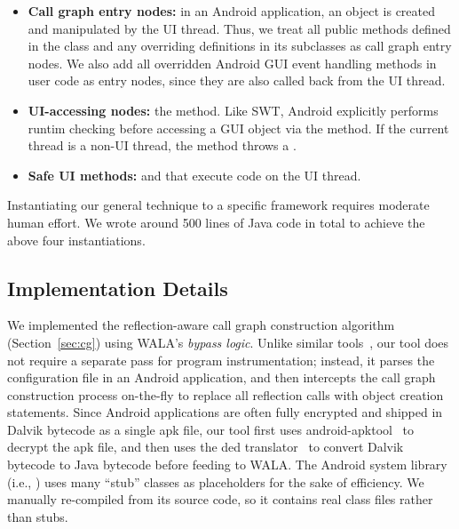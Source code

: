 \begin{itemize}

\item \textbf{Call graph entry nodes: }in an Android application,
an  object is created and manipulated by the UI thread. Thus, we treat
all public methods defined in the  class 
and any overriding definitions in its subclasses as call graph entry nodes.
We also add all overridden Android GUI event handling methods in user
code as entry nodes, since they are also called back from the UI thread.

\smallstep

\item \textbf{UI-accessing nodes: }the  method.
Like SWT, Android explicitly performs runtim checking before accessing
a GUI object via the  method. If the current
thread is a non-UI thread, the  method throws
a .

\smallstep

\item \textbf{Safe UI methods: } 
and  that execute code on the UI thread. 

\end{itemize}


Instantiating our general technique to  a specific framework
requires moderate human effort. We wrote around 500 lines of Java code in total to achieve
the above four instantiations.

\subsection{Implementation Details}

We implemented the reflection-aware call graph construction
 algorithm (Section~\ref{sec:cg}) using WALA's \textit{bypass logic}.
Unlike similar tools~\cite{Payet:2011:SAA:2032266.2032299}, our tool
does not require a separate pass for program instrumentation; instead, it
parses the configuration file in an Android application,
and then intercepts the call graph construction
process on-the-fly to replace all reflection calls with object creation statements.
Since Android applications are often fully encrypted and shipped in Dalvik
bytecode as a single apk file, our tool first uses
android-apktool~\cite{apktool} to
decrypt the apk file, and then uses the 
ded translator~\cite{ded} to convert
Dalvik bytecode to Java bytecode before feeding to WALA.  The Android system
library (i.e., ) uses many ``stub'' classes as
placeholders for the sake of efficiency. We manually re-compiled 
 from its source code, so it contains real
class files rather than stubs.

